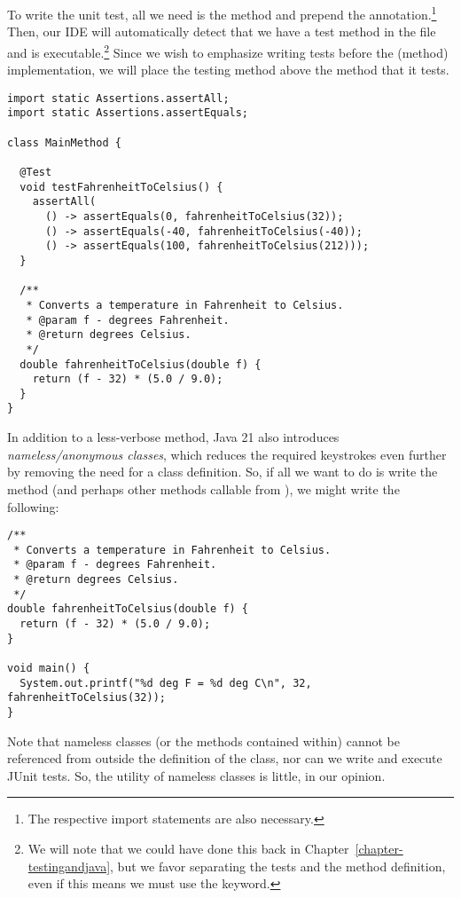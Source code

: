 To write the unit test, all we need is the  method and prepend the  annotation.\footnote{The respective import statements are also necessary.} Then, our IDE will automatically detect that we have a test method in the file and is executable.\footnote{We will note that we could have done this back in Chapter~\ref{chapter-testingandjava}, but we favor separating the tests and the method definition, even if this means we must use the  keyword.} Since we wish to emphasize writing tests before the (method) implementation, we will place the testing method above the method that it tests. 

\begin{lstlisting}[language=MyJava]
import static Assertions.assertAll;
import static Assertions.assertEquals;

class MainMethod {

  @Test
  void testFahrenheitToCelsius() {
    assertAll(
      () -> assertEquals(0, fahrenheitToCelsius(32));
      () -> assertEquals(-40, fahrenheitToCelsius(-40));
      () -> assertEquals(100, fahrenheitToCelsius(212)));
  }
  
  /**
   * Converts a temperature in Fahrenheit to Celsius.
   * @param f - degrees Fahrenheit.
   * @return degrees Celsius.
   */
  double fahrenheitToCelsius(double f) {
    return (f - 32) * (5.0 / 9.0); 
  }
}
\end{lstlisting}

In addition to a less-verbose  method, Java 21 also introduces \emph{nameless/anonymous classes}, which reduces the required keystrokes even further by removing the need for a class definition. So, if all we want to do is write the  method (and perhaps other methods callable from ), we might write the following:

\begin{lstlisting}[language=MyJava]
/**
 * Converts a temperature in Fahrenheit to Celsius.
 * @param f - degrees Fahrenheit.
 * @return degrees Celsius.
 */
double fahrenheitToCelsius(double f) {
  return (f - 32) * (5.0 / 9.0); 
}

void main() {
  System.out.printf("%d deg F = %d deg C\n", 32, fahrenheitToCelsius(32));
}
\end{lstlisting}

Note that nameless classes (or the methods contained within) cannot be referenced from outside the definition of the class, nor can we write and execute JUnit tests. So, the utility of nameless classes is little, in our opinion.

